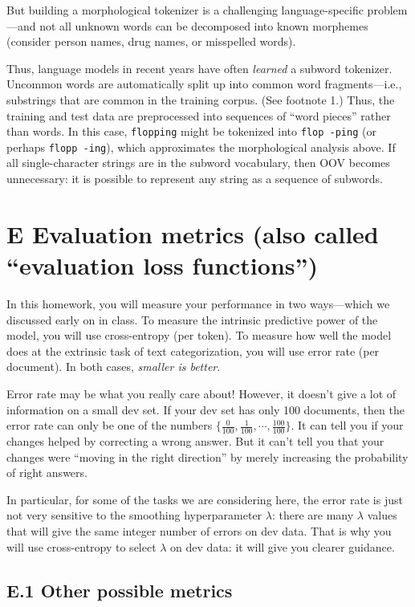 \documentclass[12pt]{article}
\theoremstyle{plain}
\theoremstyle{definition}
\theoremstyle{remark}
\begin{document}
But building a morphological tokenizer is a challenging language-specific problem—and not all unknown words can be decomposed into known morphemes (consider person names, drug names, or misspelled words).

Thus, language models in recent years have often \textit{learned} a subword tokenizer. Uncommon words are automatically split up into common word fragments—i.e., substrings that are common in the training corpus. (See footnote 1.) Thus, the training and test data are preprocessed into sequences of “word pieces” rather than words. In this case, \texttt{flopping} might be tokenized into \texttt{flop -ping} (or perhaps \texttt{flopp -ing}), which approximates the morphological analysis above. If all single-character strings are in the subword vocabulary, then OOV becomes unnecessary: it is possible to represent any string as a sequence of subwords.

\section*{E Evaluation metrics (also called ``evaluation loss functions'')}

In this homework, you will measure your performance in two ways—which we discussed early on in class. To measure the intrinsic predictive power of the model, you will use cross-entropy (per token). To measure how well the model does at the extrinsic task of text categorization, you will use error rate (per document). In both cases, \textit{smaller is better}.

Error rate may be what you really care about! However, it doesn’t give a lot of information on a small dev set. If your dev set has only 100 documents, then the error rate can only be one of the numbers $\{\tfrac{0}{100}, \tfrac{1}{100}, \cdots, \tfrac{100}{100}\}$. It can tell you if your changes helped by correcting a wrong answer. But it can’t tell you that your changes were “moving in the right direction” by merely increasing the probability of right answers.

In particular, for some of the tasks we are considering here, the error rate is just not very sensitive to the smoothing hyperparameter $\lambda$: there are many $\lambda$ values that will give the same integer number of errors on dev data. That is why you will use cross-entropy to select $\lambda$ on dev data: it will give you clearer guidance.

\subsection*{E.1 Other possible metrics}
\end{document}
